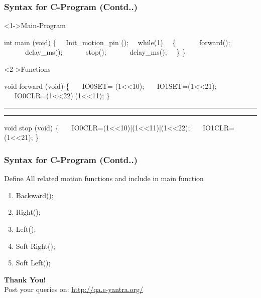 \documentclass[table,10pt,red]{beamer}
\begin{document}
\begin{frame}[shrink = 4,fragile]
	\frametitle{Syntax for C-Program (Contd..)} \pause
	
		\begin{block}<1->{Main-Program}	\pause
		\begin{semiverbatim}
				int main (void) 
				\{
			\ \		 Init_motion_pin ();
			\ \		 while(1)
			\ \	 	\{
			\ \ \ \ \ \				forward();
			\ \ \ \ \ \				delay_ms();
			\ \ \ \ \ \				stop();
			\ \ \ \ \ \				delay_ms();
			\ \	 	\}	
				\}	
			\end{semiverbatim}
		\end{block} \pause
	
	\begin{block}<2->{Functions}\pause
		\begin{semiverbatim}
				void forward (void)
				\{
 		\ \ \		IO0SET= (1<<10);
		\ \ \	 	IO1SET=(1<<21);
		\ \ \	 	IO0CLR=(1<<22)|(1<<11);		
				\}
				
				\hrule \hrule	\pause
				void stop (void)
				\{
 		\ \ \		IO0CLR=(1<<10)|(1<<11)|(1<<22);
		\ \ \	 	IO1CLR=(1<<21);		
				\}
 		\end{semiverbatim}
	\end{block}
\end{frame}

\begin{frame}
	\frametitle{Syntax for C-Program (Contd..)} \pause
	Define All related motion functions and include in main function \pause\\[10pt]
	\begin{enumerate}
		\item <+-|alert@+> Backward();\\[10pt]
		\item <+-|alert@+> Right();\\[10pt]
		\item <+-|alert@+> Left();\\[10pt]
		\item <+-|alert@+> Soft Right();\\[10pt]
		\item <+-|alert@+> Soft Left();\\[10pt]	
	\end{enumerate}
	
\end{frame}

\begin{frame}
\hskip4cm
\textbf{\LARGE Thank You!} \\[20pt]
\hskip3cm
\scriptsize Post your queries on: 
\hyperref[www.e-yantra.org]{\color{blue} http://qa.e-yantra.org/ \color{black}} 
\end{frame}
\end{document}
